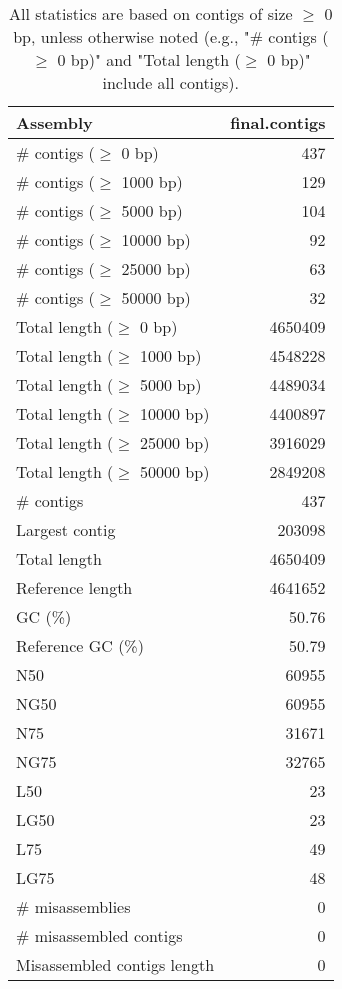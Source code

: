 \documentclass[12pt,a4paper]{article}
\begin{document}
\begin{table}[ht]
\begin{center}
\caption{All statistics are based on contigs of size $\geq$ 0 bp, unless otherwise noted (e.g., "\# contigs ($\geq$ 0 bp)" and "Total length ($\geq$ 0 bp)" include all contigs).}
\begin{tabular}{|l*{1}{|r}|}
\hline
Assembly & final.contigs \\ \hline
\# contigs ($\geq$ 0 bp) & 437 \\ \hline
\# contigs ($\geq$ 1000 bp) & 129 \\ \hline
\# contigs ($\geq$ 5000 bp) & 104 \\ \hline
\# contigs ($\geq$ 10000 bp) & 92 \\ \hline
\# contigs ($\geq$ 25000 bp) & 63 \\ \hline
\# contigs ($\geq$ 50000 bp) & 32 \\ \hline
Total length ($\geq$ 0 bp) & 4650409 \\ \hline
Total length ($\geq$ 1000 bp) & 4548228 \\ \hline
Total length ($\geq$ 5000 bp) & 4489034 \\ \hline
Total length ($\geq$ 10000 bp) & 4400897 \\ \hline
Total length ($\geq$ 25000 bp) & 3916029 \\ \hline
Total length ($\geq$ 50000 bp) & 2849208 \\ \hline
\# contigs & 437 \\ \hline
Largest contig & 203098 \\ \hline
Total length & 4650409 \\ \hline
Reference length & 4641652 \\ \hline
GC (\%) & 50.76 \\ \hline
Reference GC (\%) & 50.79 \\ \hline
N50 & 60955 \\ \hline
NG50 & 60955 \\ \hline
N75 & 31671 \\ \hline
NG75 & 32765 \\ \hline
L50 & 23 \\ \hline
LG50 & 23 \\ \hline
L75 & 49 \\ \hline
LG75 & 48 \\ \hline
\# misassemblies & 0 \\ \hline
\# misassembled contigs & 0 \\ \hline
Misassembled contigs length & 0 \\ \hline

\end{tabular}
\end{center}
\end{table}
\end{document}
